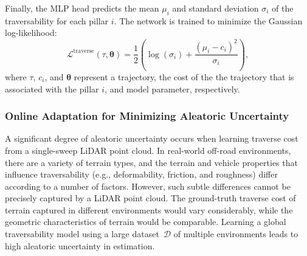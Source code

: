 Finally, the MLP head predicts the mean ${\mu}_i$ and standard deviation ${\sigma}_i$ of the traversability for each pillar $i$. The network is trained to minimize the Gaussian log-likelihood:
\begin{equation}\label{gaussiannll}
    \mathcal{L}^{\text{traverse}}\left(\tau, \bm{\theta}\right) = \frac{1}{2}\left(\log({\sigma}_i) +  \frac{({\mu}_i - c_i)^2}{{\sigma}_i} \right),
\end{equation}where $\tau$, $c_i$, and $\bm{\theta}$ represent a trajectory, the cost of the the trajectory that is associated with the pillar $i$, and model parameter, respectively.

\subsubsection{Online Adaptation for Minimizing Aleatoric Uncertainty}\label{sec:meta}

\begin{algorithm}[h]
\footnotesize
{}
\caption{Meta Learning of Traverse Cost \label{Algorithm:meta}} 
\end{algorithm} 


A significant degree of aleatoric uncertainty occurs when learning traverse cost from a single-sweep LiDAR point cloud. In real-world off-road environments, there are a variety of terrain types, and the terrain and vehicle properties that influence traversability (e.g., deformability, friction, and roughness) differ according to a number of factors. However, such subtle differences cannot be precisely captured by a LiDAR point cloud. The ground-truth traverse cost of terrain captured in different environments would vary considerably, while the geometric characteristics of terrain would be comparable. Learning a global traversability model using a large dataset~$\mathcal{D}$ of multiple environments leads to high aleatoric uncertainty in estimation.


